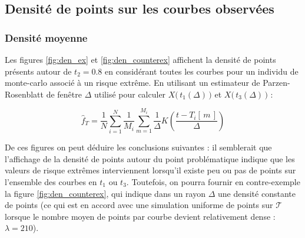 \subsection{Densité de points sur les courbes observées}

\subsubsection{Densité moyenne}

Les figures \ref{fig:den_ex} et \ref{fig:den_counterex} affichent la densité de points présents autour de $t_2 = 0.8$ en considérant toutes les courbes pour un individu de monte-carlo associé à un risque extrême. En utilisant un estimateur de Parzen-Rosenblatt de fenêtre $\Delta$ utilisé pour calculer $X\bigl( \, t_1(\Delta) \, \bigr)$ et $X\bigl( \, t_3(\Delta) \, \bigr)$ :

\begin{equation*}
	\widehat f_T = \frac 1 N \sum\limits_{i=1}^N \frac 1 {M_i} \sum\limits_{m=1}^{M_i} \frac 1 \Delta K\left( \frac{t - T_i[\, m \, ]}{\Delta} \right)
\end{equation*}

De ces figures on peut déduire les conclusions suivantes : il semblerait que l'affichage de la densité de points autour du point problématique indique que les valeurs de risque extrêmes interviennent lorsqu'il existe peu ou pas de points sur l'ensemble des courbes en $t_1$ ou $t_3$. Toutefois, on pourra fournir en contre-exemple la figure \ref{fig:den_counterex}, qui indique dans un rayon $\Delta$ une densité constante de points (ce qui est en accord avec une simulation uniforme de points sur $\mathcal T$ lorsque le nombre moyen de points par courbe devient relativement dense : $\lambda = 210$).



